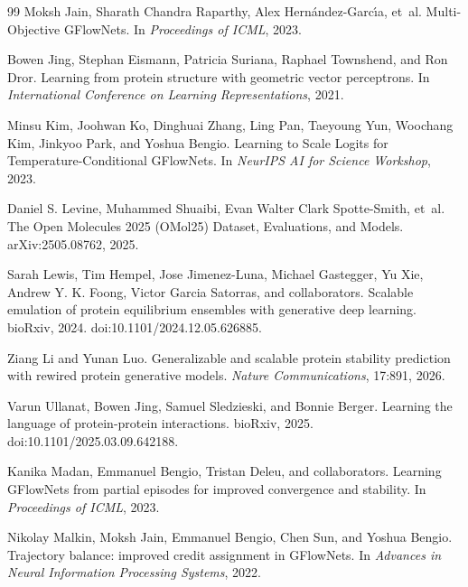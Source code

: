 \documentclass[11pt]{article}
\begin{document}
\begin{thebibliography}{99}
Moksh Jain, Sharath Chandra Raparthy, Alex Hern{\'a}ndez-Garc{\'\i}a, et~al.
\newblock Multi-Objective GFlowNets.
\newblock In \emph{Proceedings of ICML}, 2023.

Bowen Jing, Stephan Eismann, Patricia Suriana, Raphael Townshend, and Ron Dror.
\newblock Learning from protein structure with geometric vector perceptrons.
\newblock In \emph{International Conference on Learning Representations}, 2021.

Minsu Kim, Joohwan Ko, Dinghuai Zhang, Ling Pan, Taeyoung Yun, Woochang Kim, Jinkyoo Park, and Yoshua Bengio.
\newblock Learning to Scale Logits for Temperature-Conditional GFlowNets.
\newblock In \emph{NeurIPS AI for Science Workshop}, 2023.

Daniel S. Levine, Muhammed Shuaibi, Evan Walter Clark Spotte-Smith, et~al.
\newblock The Open Molecules 2025 (OMol25) Dataset, Evaluations, and Models.
\newblock arXiv:2505.08762, 2025.

Sarah Lewis, Tim Hempel, Jose Jimenez-Luna, Michael Gastegger, Yu Xie, Andrew Y. K. Foong, Victor Garcia Satorras, and collaborators.
\newblock Scalable emulation of protein equilibrium ensembles with generative deep learning.
\newblock bioRxiv, 2024. doi:10.1101/2024.12.05.626885.

Ziang Li and Yunan Luo.
\newblock Generalizable and scalable protein stability prediction with rewired protein generative models.
\newblock \emph{Nature Communications}, 17:891, 2026.


Varun Ullanat, Bowen Jing, Samuel Sledzieski, and Bonnie Berger.
\newblock Learning the language of protein-protein interactions.
\newblock bioRxiv, 2025. doi:10.1101/2025.03.09.642188.

Kanika Madan, Emmanuel Bengio, Tristan Deleu, and collaborators.
\newblock Learning GFlowNets from partial episodes for improved convergence and stability.
\newblock In \emph{Proceedings of ICML}, 2023.

Nikolay Malkin, Moksh Jain, Emmanuel Bengio, Chen Sun, and Yoshua Bengio.
\newblock Trajectory balance: improved credit assignment in GFlowNets.
\newblock In \emph{Advances in Neural Information Processing Systems}, 2022.


\end{thebibliography}
\end{document}
